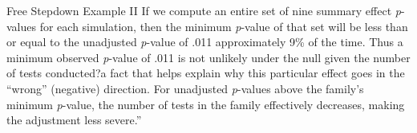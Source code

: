 \documentclass{beamer}
\begin{document}
\begin{frame}{Free Stepdown Example II}
If we compute an entire set of nine summary
effect \textit{p}-values for each simulation, then the minimum \textit{p}-value
of that set will be less than or equal to the unadjusted \textit{p}-value of
.011 approximately 9\% of the time. Thus a minimum observed
\textit{p}-value of .011 is not unlikely under the null given the number
of tests conducted?a fact that helps explain why this particular
effect goes in the ``wrong'' (negative) direction. For unadjusted \textit{p}-values above the family's minimum \textit{p}-value, the number of
tests in the family effectively decreases, making the adjustment
less severe.''

\hyperlink{FWERmain}{}
\end{frame}
\end{document}
